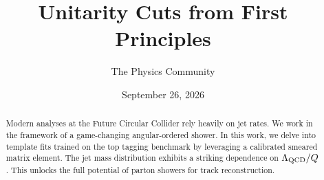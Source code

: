 \documentclass[11pt]{article}
\title{Unitarity Cuts from First Principles}
\author{The Physics Community}
\date{September 26, 2026}
\begin{document}
\maketitle
\begin{abstract}
Modern analyses at the Future Circular Collider rely heavily on jet
rates. We work in the framework of a game-changing angular-ordered
shower. In this work, we delve into template fits trained on the top
tagging benchmark by leveraging a calibrated smeared matrix element. The
jet mass distribution exhibits a striking dependence on $\Lambda_{\rm
QCD}/Q$. This unlocks the full potential of parton showers for track
reconstruction.
\end{abstract}
\tableofcontents





\nocite{*}


\end{document}
